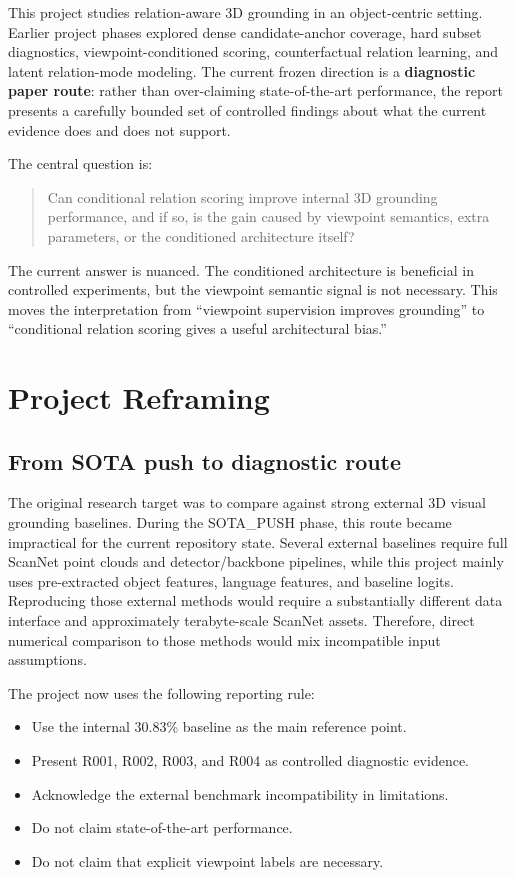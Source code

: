 \documentclass[11pt]{article}
\begin{document}
This project studies relation-aware 3D grounding in an object-centric setting. Earlier project phases explored dense candidate-anchor coverage, hard subset diagnostics, viewpoint-conditioned scoring, counterfactual relation learning, and latent relation-mode modeling. The current frozen direction is a \textbf{diagnostic paper route}: rather than over-claiming state-of-the-art performance, the report presents a carefully bounded set of controlled findings about what the current evidence does and does not support.

The central question is:
\begin{quote}
Can conditional relation scoring improve internal 3D grounding performance, and if so, is the gain caused by viewpoint semantics, extra parameters, or the conditioned architecture itself?
\end{quote}

The current answer is nuanced. The conditioned architecture is beneficial in controlled experiments, but the viewpoint semantic signal is not necessary. This moves the interpretation from ``viewpoint supervision improves grounding'' to ``conditional relation scoring gives a useful architectural bias.''

\section{Project Reframing}

\subsection{From SOTA push to diagnostic route}

The original research target was to compare against strong external 3D visual grounding baselines. During the SOTA\_PUSH phase, this route became impractical for the current repository state. Several external baselines require full ScanNet point clouds and detector/backbone pipelines, while this project mainly uses pre-extracted object features, language features, and baseline logits. Reproducing those external methods would require a substantially different data interface and approximately terabyte-scale ScanNet assets. Therefore, direct numerical comparison to those methods would mix incompatible input assumptions.

The project now uses the following reporting rule:
\begin{itemize}
  \item Use the internal 30.83\% baseline as the main reference point.
  \item Present R001, R002, R003, and R004 as controlled diagnostic evidence.
  \item Acknowledge the external benchmark incompatibility in limitations.
  \item Do not claim state-of-the-art performance.
  \item Do not claim that explicit viewpoint labels are necessary.
\end{itemize}
\end{document}
